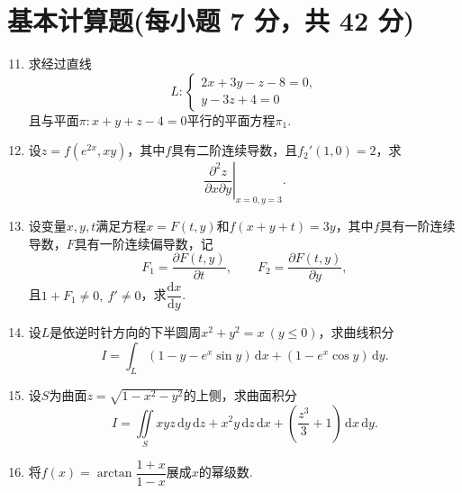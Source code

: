 \documentclass[../Main.tex]{subfiles}
\begin{document}
\section{基本计算题(每小题 7 分，共 42 分)}
\begin{enumerate}
    \setcounter{enumi}{10}
    \item 求经过直线
          \[
              L:\begin{cases}
                  2x+3y-z-8=0, \\
                  y-3z+4=0
              \end{cases}
          \]
          且与平面$\pi:x+y+z-4=0$平行的平面方程$\pi_{1}$.
          \vspace{11em}

    \item 设$z=f(e^{2x},xy)$，其中$f$具有二阶连续导数，且$f_{2}'(1,0)=2$，求
          \[
              \left.\frac{\partial^{2}z}{\partial x\partial y}\right|_{x=0,y=3}.
          \]
          \vspace{11em}

    \item 设变量$x,y,t$满足方程$x=F(t,y)$和$f(x+y+t)=3y$，其中$f$具有一阶连续导数，$F$具有一阶连续偏导数，记
          \[
              F_{1}=\frac{\partial F(t,y)}{\partial t},\qquad F_{2}=\frac{\partial F(t,y)}{\partial y},
          \]
          且$1+F_{1}\neq0,\ f'\neq0$，求$\dfrac{\mathrm{d}x}{\mathrm{d}y}$.
          \vspace{12em}

    \item 设$L$是依逆时针方向的下半圆周$x^{2}+y^{2}=x\ (y\leq0)$，求曲线积分
          \[
              I=\int_{L}(1-y-e^{x}\sin y)\,\mathrm{d}x+(1-e^{x}\cos y)\,\mathrm{d}y.
          \]
          \vspace{12em}

    \item 设$S$为曲面$z=\sqrt{1-x^{2}-y^{2}}$的上侧，求曲面积分
          \[
              I=\iint\limits_{S}xyz\,\mathrm{d}y\,\mathrm{d}z+x^{2}y\,\mathrm{d}z\,\mathrm{d}x+\left(\frac{z^{3}}{3}+1\right)\,\mathrm{d}x\,\mathrm{d}y.
          \]
          \vspace{12em}

    \item 将$f(x)=\arctan\dfrac{1+x}{1-x}$展成$x$的幂级数.
          \vspace{13em}
\end{enumerate}
\end{document}
